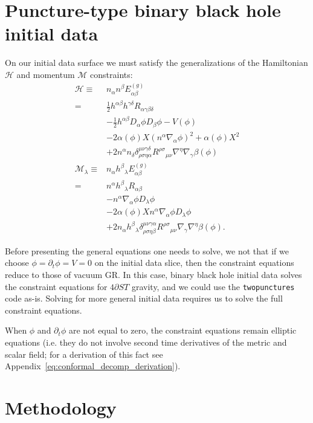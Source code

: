 \documentclass[%
notitlepage,
report,
nofootinbib,
 amsmath,amssymb,
 aps,
]{revtex4-1}
\newcommand{\ssec}[1]{\section{#1}}
\begin{document}
\ssec{Puncture-type binary black hole initial data}%
On our initial data surface we must satisfy the generalizations of
the Hamiltonian $\mathcal{H}$ and momentum $\mathcal{M}$ constraints:
\label{eq:constraints}
\begin{align}
\label{eq:hamiltonian_constraint}
   \mathcal{H}
   \equiv&
   n_{\alpha}n^{\beta}E^{(g)}_{\alpha\beta}
   \nonumber\\
   =&
   \frac{1}{2}h^{\alpha\beta}h^{\gamma\delta}R_{\alpha\gamma\beta\delta}
   \nonumber\\&
   -
   \frac{1}{2}h^{\alpha\beta}D_{\alpha}\phi D_{\beta}\phi
   -
   V\left(\phi\right)
   \nonumber\\&
   -  
   2\alpha\left(\phi\right)X\left(n^{\alpha}\nabla_{\alpha}\phi\right)^2
   +  
   \alpha\left(\phi\right)X^2
   \nonumber\\&
   +  
   2n^{\alpha}n_{\delta}
   \delta^{\mu\nu\gamma\delta}_{\rho\sigma\eta\alpha}
   R^{\rho\sigma}{}_{\mu\nu}\nabla^{\eta}\nabla_{\gamma}\beta\left(\phi\right)
   \\
\label{eq:momentum_constraint}
   \mathcal{M}_{\lambda}
   \equiv&
   n_{\alpha}h^{\beta}{}_{\lambda}E^{(g)}_{\alpha\beta}
   \nonumber\\
   =&
   n^{\alpha}h^{\beta}{}_{\lambda}R_{\alpha\beta}
   \nonumber\\&
   -  
   n^{\alpha}\nabla_{\alpha}\phi D_{\lambda}\phi
   \nonumber\\&
   -  
   2\alpha\left(\phi\right)X
   n^{\alpha}\nabla_{\alpha}\phi D_{\lambda}\phi
   \nonumber\\&
   +  
   2n_{\alpha}h^{\beta}{}_{\lambda}
   \delta^{\mu\nu\gamma\alpha}_{\rho\sigma\eta\beta}
   R^{\rho\sigma}{}_{\mu\nu}
   \nabla_{\gamma}\nabla^{\eta}\beta\left(\phi\right)
   .
\end{align}

Before presenting the general equations one needs to solve,
we not that if we choose $\phi=\partial_t\phi=V=0$ on the initial data slice,
then the constraint equations reduce to those of vacuum GR\cite{East:2020hgw}.
In this case, binary black hole initial data solves the constraint
equations for $4\partial ST$ gravity,
and we could use the \texttt{twopunctures} code as-is.
Solving for more general initial data requires us to solve
the full constraint equations.

When $\phi$ and $\partial_t\phi$ are not equal to zero,
the constraint equations remain elliptic equations
(i.e. they do not involve
second time derivatives of the metric and scalar field;
for a derivation of this fact see
Appendix~\ref{eq:conformal_decomp_derivation}).
\ssec{Methodology}%
\end{document}
